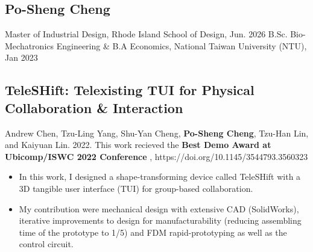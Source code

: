 \documentclass[12pt]{article}
\begin{document}
\begin{multicols}{2}
    \section*{Po-Sheng Cheng}
    \columnbreak
    {\sffamily
    Master of Industrial Design, Rhode Island School of Design, Jun. 2026 \newline
    B.Sc. Bio-Mechatronics Engineering \& \newline B.A Economics, National Taiwan University (NTU), Jan 2023
    }
\end{multicols}
        \subsection*{TeleSHift: Telexisting TUI for Physical Collaboration \& Interaction}
        {\sffamily
        {\footnotesize Andrew Chen, Tzu-Ling Yang, Shu-Yan Cheng, \textbf{Po-Sheng Cheng}, Tzu-Han Lin, and Kaiyuan Lin. 2022. This work recieved the \textbf{Best Demo Award at Ubicomp/ISWC 2022 Conference}%
        , https://doi.org/10.1145/3544793.3560323}
        \begin{itemize}
            \item In this work, I designed a shape-transforming device called TeleSHift with a 3D tangible user interface (TUI) for group-based collaboration.
            \item My contribution were mechanical design with extensive CAD (SolidWorks), iterative improvements to design for manufacturability (reducing assembling time of the prototype to 1/5) and FDM rapid-prototyping as well as the control circuit.
        \end{itemize}
        }
\end{document}
